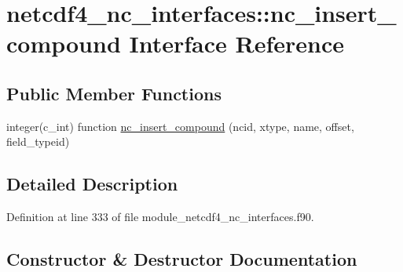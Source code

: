 \hypertarget{interfacenetcdf4__nc__interfaces_1_1nc__insert__compound}{}\section{netcdf4\+\_\+nc\+\_\+interfaces\+:\+:nc\+\_\+insert\+\_\+compound Interface Reference}
\label{interfacenetcdf4__nc__interfaces_1_1nc__insert__compound}
\subsection*{Public Member Functions}
\begin{DoxyCompactItemize}
\item 
integer(c\+\_\+int) function \hyperlink{interfacenetcdf4__nc__interfaces_1_1nc__insert__compound_aa5068e25ce61eaa482cc0f40c9e1e8f6}{nc\+\_\+insert\+\_\+compound} (ncid, xtype, name, offset, field\+\_\+typeid)
\end{DoxyCompactItemize}


\subsection{Detailed Description}


Definition at line 333 of file module\+\_\+netcdf4\+\_\+nc\+\_\+interfaces.\+f90.



\subsection{Constructor \& Destructor Documentation}
\mbox{\label{interfacenetcdf4__nc__interfaces_1_1nc__insert__compound_aa5068e25ce61eaa482cc0f40c9e1e8f6}} 

